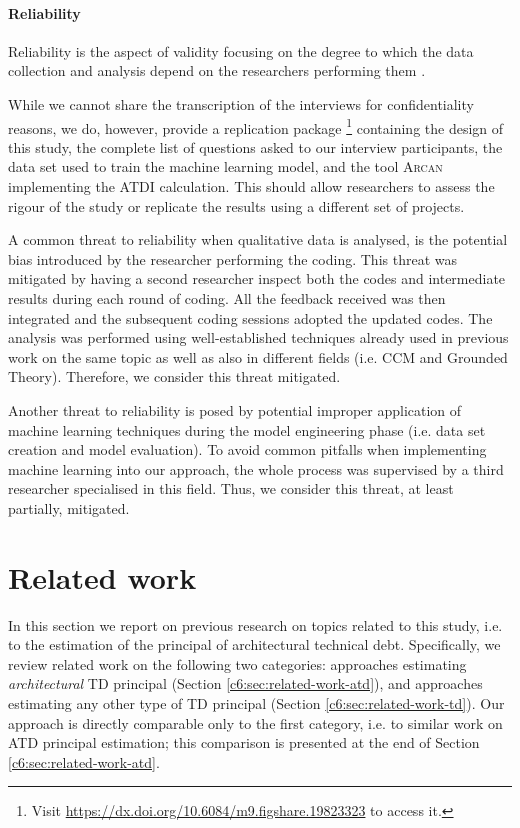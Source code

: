 \paragraph*{Reliability}
Reliability is the aspect of validity focusing on the degree to which the data collection and analysis depend on the researchers performing them \cite{Runeson2012}.

While we cannot share the transcription of the interviews for confidentiality reasons, we do, however, provide a replication package \footnote{Visit \url{https://dx.doi.org/10.6084/m9.figshare.19823323} to access it.} containing the design of this study, the complete list of questions asked to our interview participants, the data set used to train the machine learning model, and the tool \textsc{Arcan} implementing the ATDI calculation.
This should allow researchers to assess the rigour of the study or replicate the results using a different set of projects.

A common threat to reliability when qualitative data is analysed, is the potential bias introduced by the researcher performing the coding.
This threat was mitigated by having a second researcher inspect both the codes and intermediate results during each round of coding. All the feedback received was then integrated and the subsequent coding sessions adopted the updated codes.
The analysis was performed using well-established techniques already used in previous work on the same topic as well as also in different fields (i.e. CCM and Grounded Theory).
Therefore, we consider this threat mitigated.

Another threat to reliability is posed by potential improper application of machine learning techniques during the model engineering phase (i.e. data set creation and model evaluation). 
To avoid common pitfalls when implementing machine learning into our approach, 
the whole process was supervised by a third researcher specialised in this field.
Thus, we consider this threat, at least partially, mitigated.


\section{Related work}\label{c6:sec:related-work}
In this section we report on previous research on topics related to this study, i.e. to the estimation of the principal of architectural technical debt. Specifically, we review related work on the following two categories: approaches estimating \emph{architectural} TD principal (Section \ref{c6:sec:related-work-atd}), and approaches estimating any other type of TD principal (Section \ref{c6:sec:related-work-td}).
Our approach is directly comparable only to the first category, i.e. to similar work on ATD principal estimation; this comparison is presented at the end of Section \ref{c6:sec:related-work-atd}.

